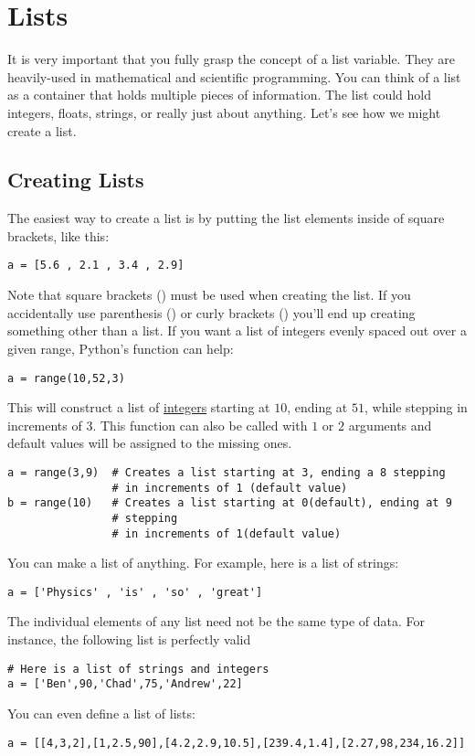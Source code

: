 \section{Lists}
It is very important that you fully grasp the concept of a list
variable.  They are heavily-used in mathematical and scientific
programming.  You can think of a list as a container that holds
multiple pieces of information. The list could hold integers, floats,
strings, or really just about anything.  Let's see how we might create
a list.

\subsection*{Creating Lists}
The easiest way to create  a list is by putting the list elements
inside of square brackets, like this:
\begin{Verbatim}
a = [5.6 , 2.1 , 3.4 , 2.9]
\end{Verbatim}
Note that square brackets (\code{[]}) must be used when creating the
list. If you accidentally use parenthesis (\code{()})  or curly brackets (\code{\{\}}) you'll end up creating
something other than a list.  If you want a list of integers evenly
spaced out over a given range, Python's  function can help:
\begin{Verbatim}
a = range(10,52,3)
\end{Verbatim}
This will construct a list of \ul{integers} starting at $10$, ending at
$51$, while stepping in increments of $3$. This function can also be
called with $1$ or $2$ arguments and default values will be assigned
to the missing ones.
\begin{Verbatim}
a = range(3,9)  # Creates a list starting at 3, ending a 8 stepping
                # in increments of 1 (default value)
b = range(10)   # Creates a list starting at 0(default), ending at 9
                # stepping
                # in increments of 1(default value)
\end{Verbatim}
\noindent You can make a list of anything.  For example, here is a
list of strings:
\begin{Verbatim}
a = ['Physics' , 'is' , 'so' , 'great']
\end{Verbatim}
The individual elements of any list need not be the same type of
data.  For instance, the following list is perfectly valid
\begin{Verbatim}
# Here is a list of strings and integers
a = ['Ben',90,'Chad',75,'Andrew',22]
\end{Verbatim}
You can even define a list of lists:
\begin{Verbatim}
a = [[4,3,2],[1,2.5,90],[4.2,2.9,10.5],[239.4,1.4],[2.27,98,234,16.2]]
\end{Verbatim}

